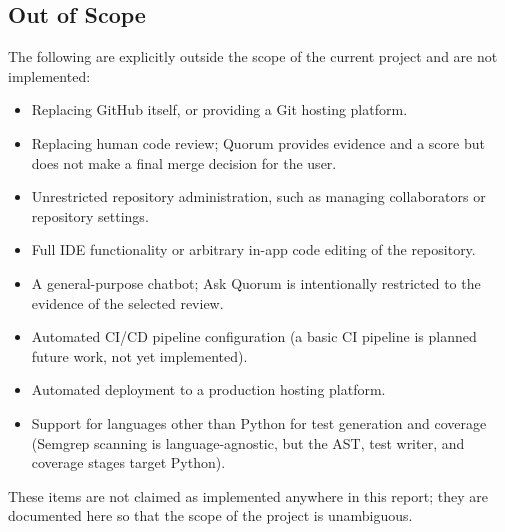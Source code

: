 \subsection{Out of Scope}

The following are explicitly outside the scope of the current project and are
not implemented:

\begin{itemize}
  \item Replacing GitHub itself, or providing a Git hosting platform.
  \item Replacing human code review; Quorum provides evidence and a score but
        does not make a final merge decision for the user.
  \item Unrestricted repository administration, such as managing collaborators
        or repository settings.
  \item Full IDE functionality or arbitrary in-app code editing of the
        repository.
  \item A general-purpose chatbot; Ask Quorum is intentionally restricted to
        the evidence of the selected review.
  \item Automated CI/CD pipeline configuration (a basic CI pipeline is planned
        future work, not yet implemented).
  \item Automated deployment to a production hosting platform.
  \item Support for languages other than Python for test generation and
        coverage (Semgrep scanning is language-agnostic, but the AST, test
        writer, and coverage stages target Python).
\end{itemize}

These items are not claimed as implemented anywhere in this report; they are
documented here so that the scope of the project is unambiguous.
